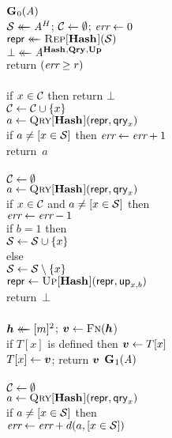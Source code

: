 \begin{figure*}
  {
    \underline{$\mathbf{G}\hspace{0.5pt}_0(\mathit{A})$}\\[2pt]
      $\mathcal{S} \mathrel{\leftarrow\mkern-14mu\leftarrow} \mathit{A}^H$; $\mathcal{C} \gets \emptyset$; $\textit{err} \gets 0$\\
      $\mathsf{repr} \mathrel{\leftarrow\mkern-14mu\leftarrow} \textsc{Rep}[\mathbf{Hash}\hspace{0.5pt}](\mathcal{S})$\\
      $\bot \mathrel{\leftarrow\mkern-14mu\leftarrow} \mathit{A}^{\mathbf{Hash}\hspace{0.5pt},\mathbf{Qry}\hspace{0.5pt},\mathbf{Up}\hspace{0.5pt}}$\\
      return $(\textit{err} \geq r)$
    \\[6pt]
    \\[2pt]
      if $x \in \mathcal{C}$ then return $\bot$\\
      $\mathcal{C} \gets \mathcal{C} \cup \{x\}$\\
      $a \gets \textsc{Qry}[\mathbf{Hash}\hspace{0.5pt}](\mathsf{repr}, \mathsf{qry}_x)$\\
      if $a \neq [x \in \mathcal{S}]$ then $\textit{err} \gets \textit{err} + 1$\\
      return~$a$
    \\[6pt]
    \\[2pt]
      $\mathcal{C} \gets \emptyset$\\
      $a \gets \textsc{Qry}[\mathbf{Hash}\hspace{0.5pt}](\mathsf{repr}, \mathsf{qry}_x)$\\
      if $x \in \mathcal{C}$ and $a \neq [x \in \mathcal{S}]$ then\\
      \tab $\textit{err} \gets \textit{err}-1$\\
      if $b = 1$ then\\
      \tab $\mathcal{S} \gets \mathcal{S} \cup \{x\}$\\
      else\\
      \tab $\mathcal{S} \gets \mathcal{S} \setminus \{x\}$\\
      $\mathsf{repr} \gets \textsc{Up}[\mathbf{Hash}\hspace{0.5pt}](\mathsf{repr},\mathsf{up}_{x,b})$\\
      return~$\bot$
    \\[6pt]
    \\
      $\hh \getsr [m]^2$; $\vv \gets \fff(\hh$)\\
      if $T[x]$ is defined then $\vv \gets T[x]$\\
      $T[x] \gets \vv$;
      return $\vv$
  }
  {
    \underline{$\mathbf{G}\hspace{0.5pt}_1(\mathit{A})$}\\[2pt]
    \\[2pt]
      $\mathcal{C} \gets \emptyset$\\
      $a \gets \textsc{Qry}[\mathbf{Hash}\hspace{0.5pt}](\mathsf{repr}, \mathsf{qry}_x)$\\
      if $a \neq [x \in \mathcal{S}]$ then\\
      \tab $\textit{err} \gets \textit{err}+d(a,[x \in \mathcal{S}])$\\
}
\end{figure*}
